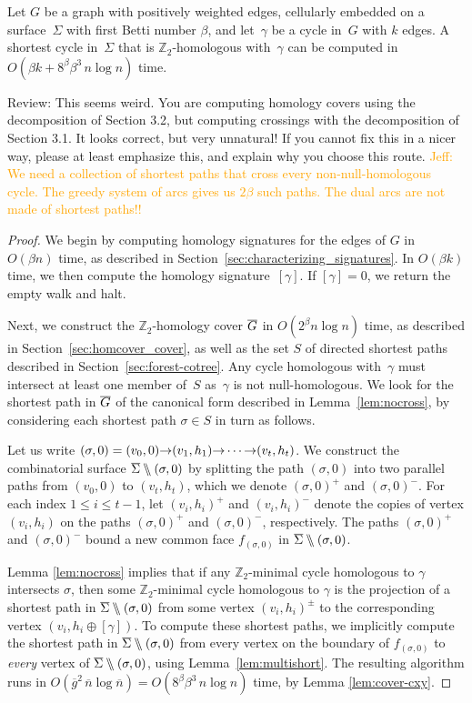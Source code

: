 \documentclass[letterpaper,review]{siamart190516}
\def\arcto{\mathord\shortrightarrow}
\def\Z{\mathbb{Z}}
\def\snip{\mathbin{\raisebox{0.15ex}{\rotatebox[origin=c]{60}{\Rightscissors}\!}}}
\def\snip{\mathbin{\backslash\!\!\backslash}}
\def\cycle{\gamma}
\def\Sigmabar{\overline{\smash{\Sigma}\vphantom{t}}}
\def\Gbar{\overline{\smash{G}\vphantom{t}}}
\def\nbar{\overline{n}}
\def\gbar{\overline{g}}
\def\rnote#1{\color{red}Review: #1 \color{black}}
\def\jnote#1{\textcolor{orange}{Jeff: #1}}
\begin{document}
{\begin{theorem}
\label{thm:min-cycle}
Let $G$ be a graph with positively weighted edges, cellularly embedded on a surface~$\Sigma$ with first Betti number $\beta$, and let~$\cycle$ be a cycle in~$G$ with $k$ edges.  A shortest cycle in~$\Sigma$ that is $\Z_2$-homologous with~$\cycle$ can be computed in $O(\beta k + 8^\beta \beta^3\, n\log n)$ time.
\end{theorem}
\rnote{
This seems weird. You are computing homology covers using the decomposition of Section 3.2, but computing crossings with the decomposition of Section 3.1. It looks correct, but very unnatural! If you cannot fix this in a nicer way, please at least emphasize this, and explain why you choose this route. 
}
\jnote{We need a collection of shortest paths that cross every non-null-homologous cycle.  The greedy system of arcs gives us $2\beta$ such paths.  The dual arcs are not made of shortest paths!!}
\begin{proof}
We begin by computing homology signatures for the edges of $G$ in $O(\beta n)$ time, as described in Section~\ref{sec:characterizing_signatures}.  In $O(\beta k)$ time, we then compute the homology signature~$[\cycle]$.  If $[\cycle] = 0$, we return the empty walk and halt.

Next, we construct the $\Z_2$-homology cover $\Gbar$ in $O(2^\beta n\log n)$ time, as described in Section~\ref{sec:homcover_cover}, as well as the set $S$ of directed shortest paths described in Section~\ref{sec:forest-cotree}.
Any cycle homologous with~$\cycle$ must intersect at least one member of~$S$ as~$\cycle$ is not null-homologous.
We look for the shortest path in $\Gbar$ of the canonical form described in Lemma~\ref{lem:nocross}, by considering each shortest path $\sigma\in S$ in turn as follows.

Let us write $(\sigma,0) = (v_0,0) \arcto (v_1,h_1) \arcto\allowbreak \cdots\arcto (v_t, h_t)$.  We construct the combinatorial surface $\Sigmabar\snip(\sigma,0)$ by splitting the path $(\sigma,0)$ into two parallel paths from $(v_0,0)$ to $(v_t,h_t)$, which we denote  $(\sigma,0)^+$ and $(\sigma,0)^-$.  For each index $1\le i\le t-1$, let $(v_i,h_i)^+$ and $(v_i,h_i)^-$ denote the copies of vertex $(v_i,h_i)$  on the paths $(\sigma,0)^+$ and $(\sigma,0)^-$, respectively.  The paths $(\sigma,0)^+$ and $(\sigma,0)^-$ bound a new common face $f_{(\sigma,0)}$ in $\Sigmabar\snip(\sigma,0)$.

Lemma \ref{lem:nocross} implies that if any $\Z_2$-minimal cycle homologous to $\cycle$ intersects $\sigma$, then some $\Z_2$-minimal cycle homologous to $\cycle$ is the projection of a shortest path in $\Sigmabar\snip(\sigma,0)$ from some vertex $(v_i,h_i)^\pm$ to the corresponding vertex $(v_i, h_i\oplus[\cycle])$.  To compute these shortest paths, we implicitly compute the shortest path in $\Sigmabar\snip(\sigma,0)$ from every vertex on the boundary of $f_{(\sigma,0)}$ to \emph{every} vertex of $\Sigmabar\snip(\sigma,0)$, using Lemma~\ref{lem:multishort}.
The resulting algorithm runs in $O(\gbar^2\,\nbar \log \nbar) = O(8^\beta \beta^3\, n\log n)$ time, by Lemma \ref{lem:cover-cxy}.
\end{proof}

}
\end{document}

